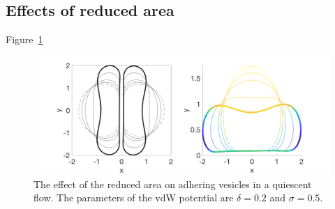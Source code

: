 \documentclass[%
preprint,
 amsmath,amssymb,
 aps,
]{revtex4-1}
\begin{document}


\subsection{Effects of reduced area}
\label{sec:qflow_reduced_area} 
Figure~\ref{fig:qflow_reduced_area}

\begin{figure}
\includegraphics[keepaspectratio=true,scale=0.5]{figs/nrelax2Ves02o_rA.png}
\caption{The effect of the reduced area on adhering vesicles in a
quiescent flow.  The parameters of the vdW potential are $\delta = 0.2$
and $\sigma = 0.5$.}
\label{fig:qflow_reduced_area}
\end{figure}


\end{document}
